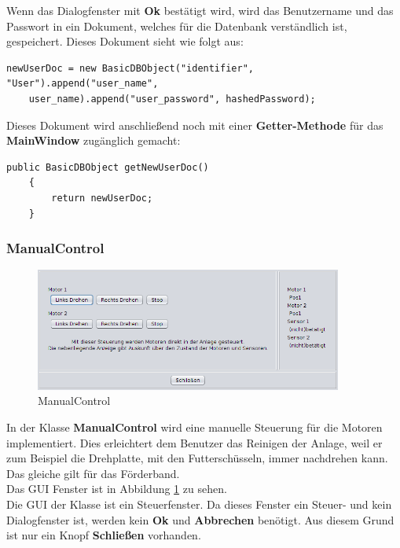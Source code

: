 \vspace{10pt}

Wenn das Dialogfenster mit \textbf{Ok} bestätigt wird, wird das Benutzername und das Passwort in ein Dokument, welches für die Datenbank verständlich ist, gespeichert. Dieses Dokument sieht wie folgt aus:
\begin{lstlisting}[style=Javastyle, caption=Benutzerdokument]
newUserDoc = new BasicDBObject("identifier", "User").append("user_name", 
	user_name).append("user_password", hashedPassword);
\end{lstlisting}

Dieses Dokument wird anschließend noch mit einer \textbf{Getter-Methode} für das  \textbf{MainWindow} zugänglich gemacht:
\begin{lstlisting}[style=Javastyle, caption=Benutzerdokument Getter-Methode]
	public BasicDBObject getNewUserDoc()
	{
		return newUserDoc;
	}
\end{lstlisting}

\subsubsection{ManualControl}
  \begin{figure}[H]
    \includegraphics[width=0.90\textwidth]{Bilder/GUI/ManualControl}
    \caption{ManualControl}
  \label{ManualControl}
  \end{figure}
In der Klasse \textbf{ManualControl} wird eine manuelle Steuerung für die Motoren implementiert. Dies erleichtert dem Benutzer das Reinigen der Anlage, weil er zum Beispiel die Drehplatte, mit den Futterschüsseln, immer nachdrehen kann. Das gleiche gilt für das Förderband.
\\ Das GUI Fenster ist in Abbildung \ref{ManualControl} zu sehen.
\\ Die GUI der Klasse ist ein Steuerfenster. Da dieses Fenster ein Steuer- und kein Dialogfenster ist, werden kein \textbf{Ok} und \textbf{Abbrechen} benötigt. Aus diesem Grund ist nur ein Knopf \textbf{Schließen} vorhanden.

